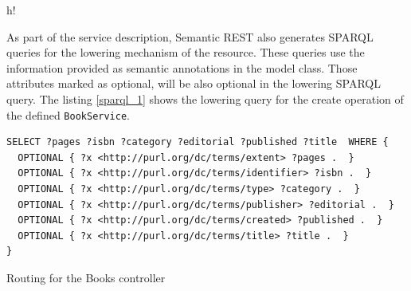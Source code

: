 \begin{table}{h!}
\noindent{}
\caption{RDFa encoded version of the Book Service}
\label{book_service_2}
\end{table}


As part of the service description, Semantic REST also generates SPARQL queries for the lowering mechanism of the
resource. These queries use the information provided as semantic annotations in the model class. Those attributes
marked as optional, will be also optional in the lowering SPARQL query. The listing \ref{sparql_1} shows the lowering
query for the create operation of the defined \texttt{BookService}. 

\begin{table}
\vspace{5 mm}
\begin{lstlisting}
SELECT ?pages ?isbn ?category ?editorial ?published ?title  WHERE {
  OPTIONAL { ?x <http://purl.org/dc/terms/extent> ?pages .  } 
  OPTIONAL { ?x <http://purl.org/dc/terms/identifier> ?isbn .  } 
  OPTIONAL { ?x <http://purl.org/dc/terms/type> ?category .  } 
  OPTIONAL { ?x <http://purl.org/dc/terms/publisher> ?editorial .  } 
  OPTIONAL { ?x <http://purl.org/dc/terms/created> ?published .  } 
  OPTIONAL { ?x <http://purl.org/dc/terms/title> ?title .  }  
}
\end{lstlisting} 
\vspace{5 mm}
\caption{Routing for the Books controller}
\label{routing_1}
\end{table}

